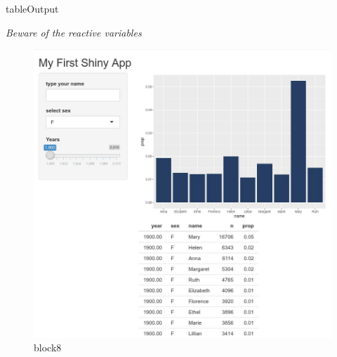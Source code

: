 \documentclass[
  ignorenonframetext,
]{beamer}
\begin{document}
\begin{frame}{tableOutput}
\protect\hypertarget{tableoutput}{}

\emph{Beware of the reactive variables}

\begin{figure}
\centering
\includegraphics{images/table.jpg}
\caption{block8}
\end{figure}

\end{frame}
\end{document}
